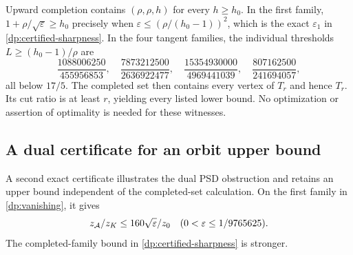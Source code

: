 Upward completion contains $(\rho,\rho,h)$ for every $h\ge h_0$.
In the first family, $1+\rho/\sqrt\varepsilon\ge h_0$ precisely when
$\varepsilon\le(\rho/(h_0-1))^2$, which is the exact $\varepsilon_1$
in \cref{dp:certified-sharpness}. In the four tangent families, the
individual thresholds $L\ge(h_0-1)/\rho$ are
\[
 \frac{1088006250}{455956853},\quad
 \frac{7873212500}{2636922477},\quad
 \frac{15354930000}{4969441039},\quad
 \frac{807162500}{241694057},
\]
all below $17/5$. The completed set then contains every vertex of $T_r$
and hence $T_r$. Its cut ratio is at least $r$, yielding every listed
lower bound. No optimization or assertion of optimality is needed for these
witnesses.

\subsection{A dual certificate for an orbit upper bound}\label{dp:dual-depth}

A second exact certificate illustrates the dual PSD obstruction and retains
an upper bound independent of the completed-set calculation. On the first
family in \cref{dp:vanishing}, it gives
\[
 z_{\mathcal A}/z_K\le160\sqrt\varepsilon/z_0\quad
 (0<\varepsilon\le1/9765625).
\]
The completed-family bound in \cref{dp:certified-sharpness} is stronger.

